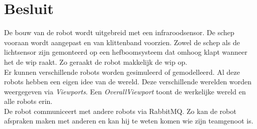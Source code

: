 \documentclass[tt3]{penoverslag}
\begin{document}
\section{Besluit}
\label{sec:Besluit}
De bouw van de robot wordt uitgebreid met een infraroodsensor. De schep vooraan wordt aangepast en van klittenband voorzien. Zowel de schep als de lichtsensor zijn gemonteerd op een hefboomsysteem dat omhoog klapt wanneer het de wip raakt. Zo geraakt de robot makkelijk de wip op.\\

Er kunnen verschillende robots worden gesimuleerd of gemodelleerd. Al deze robots hebben een eigen idee van de wereld. Deze verschillende werelden worden weergegeven via \textit{Viewports}. Een \textit{OverallViewport} toont de werkelijke wereld en alle robots erin.\\

De robot communiceert met andere robots via RabbitMQ. Zo kan de robot afspraken maken met anderen en kan hij te weten komen wie zijn teamgenoot is.


\newpage
\makeappendix
\end{document}
